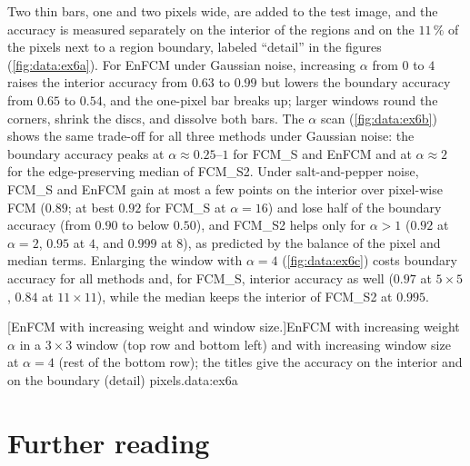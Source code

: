 Two thin bars, one and two pixels wide, are added to the test image, and the accuracy is measured separately on the interior of the regions and on the $11\,\%$ of the pixels next to a region boundary, labeled ``detail'' in the figures (\cref{fig:data:ex6a}). For EnFCM under Gaussian noise, increasing $\alpha$ from $0$ to $4$ raises the interior accuracy from $0.63$ to $0.99$ but lowers the boundary accuracy from $0.65$ to $0.54$, and the one-pixel bar breaks up; larger windows round the corners, shrink the discs, and dissolve both bars. The $\alpha$ scan (\cref{fig:data:ex6b}) shows the same trade-off for all three methods under Gaussian noise: the boundary accuracy peaks at $\alpha\approx0.25$--$1$ for FCM\_S and EnFCM and at $\alpha\approx2$ for the edge-preserving median of FCM\_S2. Under salt-and-pepper noise, FCM\_S and EnFCM gain at most a few points on the interior over pixel-wise FCM ($0.89$; at best $0.92$ for FCM\_S at $\alpha=16$) and lose half of the boundary accuracy (from $0.90$ to below $0.50$), and FCM\_S2 helps only for $\alpha>1$ ($0.92$ at $\alpha=2$, $0.95$ at $4$, and $0.999$ at $8$), as predicted by the balance of the pixel and median terms. Enlarging the window with $\alpha=4$ (\cref{fig:data:ex6c}) costs boundary accuracy for all methods and, for FCM\_S, interior accuracy as well ($0.97$ at $5\times5$, $0.84$ at $11\times11$), while the median keeps the interior of FCM\_S2 at $0.995$.

[EnFCM with increasing weight and window size.]{EnFCM with increasing weight $\alpha$ in a $3\times3$ window (top row and bottom left) and with increasing window size at $\alpha=4$ (rest of the bottom row); the titles give the accuracy on the interior and on the boundary (detail) pixels.}{data:ex6a}

\section{Further reading}\label{sec:data:reading}

